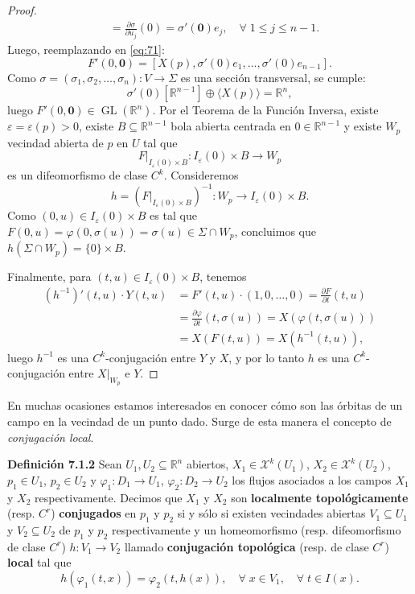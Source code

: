 \documentclass[11pt,a4paper]{article}
\theoremstyle{definition}
\theoremstyle{plain}
\theoremstyle{remark}
\newcommand{\restr}[2]{\left.#1\right|_{#2}}
\begin{document}
\begin{proof}
\[\begin{aligned}
			&= \frac{\partial \sigma}{\partial u_j}(0) = \sigma'(\mathbf{0}) e_j, \quad \forall \; 1 \le j \le n-1.
		\end{aligned}
		\]
		Luego, reemplazando en \eqref{eq:71}:
		\[
		F'(0, \mathbf{0}) = \left[ X(p), \sigma'(0)e_1, \dots, \sigma'(0)e_{n-1} \right].
		\]
		Como $\sigma = (\sigma_1, \sigma_2, \dots, \sigma_n) : V \to \Sigma$ es una sección transversal, se cumple:
		\[
		\sigma'(0)[\mathbb{R}^{n-1}] \oplus \langle X(p) \rangle = \mathbb{R}^n,
		\]
		luego $F'(0, \mathbf{0}) \in \operatorname{GL}(\mathbb{R}^n)$. Por el Teorema de la Función Inversa, existe $\varepsilon = \varepsilon(p) > 0$, existe $B \subseteq \mathbb{R}^{n-1}$ bola abierta centrada en $0 \in \mathbb{R}^{n-1}$ y existe $W_p$ vecindad abierta de $p$ en $U$ tal que
		\[
		\restr{F}{I_\varepsilon(0) \times B} : I_\varepsilon(0) \times B \to W_p
		\]
		es un difeomorfismo de clase $C^k$. Consideremos
		\[
		h = \left( \restr{F}{I_\varepsilon(0) \times B} \right)^{-1} : W_p \to I_\varepsilon(0) \times B.
		\]
		Como $(0, u) \in I_\varepsilon(0) \times B$ es tal que $F(0, u) = \varphi(0, \sigma(u)) = \sigma(u) \in \Sigma \cap W_p$, concluimos que $h(\Sigma \cap W_p) = \{0\} \times B$.
		
		Finalmente, para $(t, u) \in I_\varepsilon(0) \times B$, tenemos
		\[
		\begin{aligned}
			(h^{-1})'(t, u) \cdot Y(t, u) &= F'(t, u) \cdot (1, 0, \dots, 0) = \frac{\partial F}{\partial t}(t, u) \\
			&= \frac{\partial \varphi}{\partial t}(t, \sigma(u)) = X(\varphi(t, \sigma(u))) \\
			&= X(F(t, u)) = X(h^{-1}(t, u)),
		\end{aligned}
		\]
		luego $h^{-1}$ es una $C^k$-conjugación entre $Y$ y $X$, y por lo tanto $h$ es una $C^k$-conjugación entre $\restr{X}{W_p}$ e $Y$.
	\end{proof}
	
	En muchas ocasiones estamos interesados en conocer cómo son las órbitas de un campo en la vecindad de un punto dado. Surge de esta manera el concepto de \textit{conjugación local}.
	
	\noindent \textbf{Definición 7.1.2} Sean $U_1, U_2 \subseteq \mathbb{R}^n$ abiertos, $X_1 \in \mathcal{X}^k(U_1)$, $X_2 \in \mathcal{X}^k(U_2)$, $p_1 \in U_1$, $p_2 \in U_2$ y $\varphi_1 : D_1 \to U_1$, $\varphi_2 : D_2 \to U_2$ los flujos asociados a los campos $X_1$ y $X_2$ respectivamente. Decimos que $X_1$ y $X_2$ son \textbf{localmente topológicamente} (resp. $C^r$) \textbf{conjugados} en $p_1$ y $p_2$ si y sólo si existen vecindades abiertas $V_1 \subseteq U_1$ y $V_2 \subseteq U_2$ de $p_1$ y $p_2$ respectivamente y un homeomorfismo (resp. difeomorfismo de clase $C^r$) $h : V_1 \to V_2$ llamado \textbf{conjugación topológica} (resp. de clase $C^r$) \textbf{local} tal que
	\[
	h(\varphi_1(t, x)) = \varphi_2(t, h(x)), \quad \forall \; x \in V_1, \quad \forall \; t \in I(x).
	\]
\end{document}
